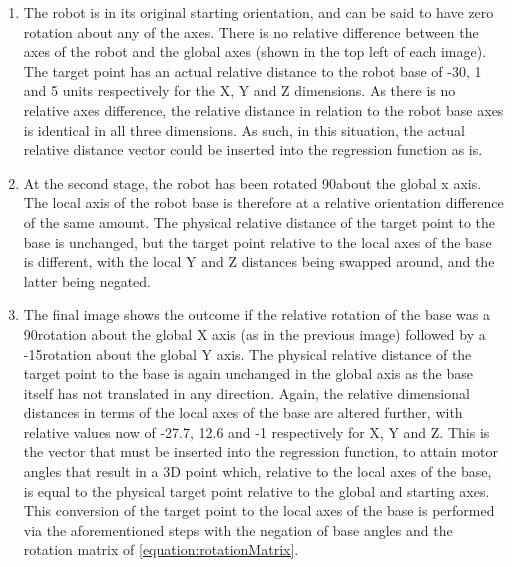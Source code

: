 \documentclass[11pt]{article}
\begin{document}
\begin{enumerate}
\item{The robot is in its original starting orientation, and can be said to have zero rotation about any of the axes. There is no relative difference between the axes of the robot and the global axes (shown in the top left of each image). The target point has an actual relative distance to the robot base of -30, 1 and 5 units respectively for the X, Y and Z dimensions. As there is no relative axes difference, the relative distance in relation to the robot base axes is identical in all three dimensions. As such, in this situation, the actual relative distance vector could be inserted into the regression function as is.}
\item{At the second stage, the robot has been rotated 90\degree about the global x axis. The local axis of the robot base is therefore at a relative orientation difference of the same amount. The physical relative distance of the target point to the base is unchanged, but the target point relative to the local axes of the base is different, with the local Y and Z distances being swapped around, and the latter being negated.}
\item{The final image shows the outcome if the relative rotation of the base was a 90\degree rotation about the global X axis (as in the previous image) followed by a -15\degree rotation about the global Y axis. The physical relative distance of the target point to the base is again unchanged in the global axis as the base itself has not translated in any direction. Again, the relative dimensional distances in terms of the local axes of the base are altered further, with relative values now of -27.7, 12.6 and -1 respectively for X, Y and Z. This is the vector that must be inserted into the regression function, to attain motor angles that result in a 3D point which, relative to the local axes of the base, is equal to the physical target point relative to the global and starting axes. This conversion of the target point to the local axes of the base is performed via the aforementioned steps with the negation of base angles and the rotation matrix of \ref{equation:rotationMatrix}}.
\end{enumerate}
\end{document}
